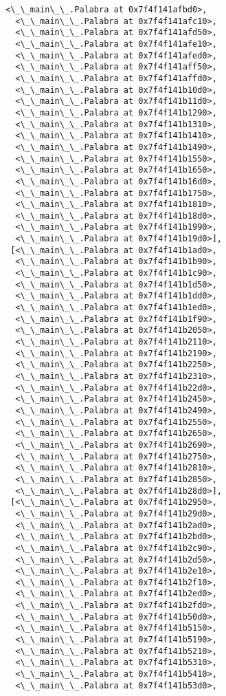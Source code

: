 \documentclass[12pt,a4paper,table]{article}
\begin{document}
\begin{tcolorbox}[breakable, size=fbox, boxrule=.5pt, pad at break*=1mm, opacityfill=0]
\begin{Verbatim}[commandchars=\\\{\}]
  <\_\_main\_\_.Palabra at 0x7f4f141afbd0>,
  <\_\_main\_\_.Palabra at 0x7f4f141afc10>,
  <\_\_main\_\_.Palabra at 0x7f4f141afd50>,
  <\_\_main\_\_.Palabra at 0x7f4f141afe10>,
  <\_\_main\_\_.Palabra at 0x7f4f141afed0>,
  <\_\_main\_\_.Palabra at 0x7f4f141aff50>,
  <\_\_main\_\_.Palabra at 0x7f4f141affd0>,
  <\_\_main\_\_.Palabra at 0x7f4f141b10d0>,
  <\_\_main\_\_.Palabra at 0x7f4f141b11d0>,
  <\_\_main\_\_.Palabra at 0x7f4f141b1290>,
  <\_\_main\_\_.Palabra at 0x7f4f141b1310>,
  <\_\_main\_\_.Palabra at 0x7f4f141b1410>,
  <\_\_main\_\_.Palabra at 0x7f4f141b1490>,
  <\_\_main\_\_.Palabra at 0x7f4f141b1550>,
  <\_\_main\_\_.Palabra at 0x7f4f141b1650>,
  <\_\_main\_\_.Palabra at 0x7f4f141b16d0>,
  <\_\_main\_\_.Palabra at 0x7f4f141b1750>,
  <\_\_main\_\_.Palabra at 0x7f4f141b1810>,
  <\_\_main\_\_.Palabra at 0x7f4f141b18d0>,
  <\_\_main\_\_.Palabra at 0x7f4f141b1990>,
  <\_\_main\_\_.Palabra at 0x7f4f141b19d0>],
 [<\_\_main\_\_.Palabra at 0x7f4f141b1ad0>,
  <\_\_main\_\_.Palabra at 0x7f4f141b1b90>,
  <\_\_main\_\_.Palabra at 0x7f4f141b1c90>,
  <\_\_main\_\_.Palabra at 0x7f4f141b1d50>,
  <\_\_main\_\_.Palabra at 0x7f4f141b1dd0>,
  <\_\_main\_\_.Palabra at 0x7f4f141b1ed0>,
  <\_\_main\_\_.Palabra at 0x7f4f141b1f90>,
  <\_\_main\_\_.Palabra at 0x7f4f141b2050>,
  <\_\_main\_\_.Palabra at 0x7f4f141b2110>,
  <\_\_main\_\_.Palabra at 0x7f4f141b2190>,
  <\_\_main\_\_.Palabra at 0x7f4f141b2250>,
  <\_\_main\_\_.Palabra at 0x7f4f141b2310>,
  <\_\_main\_\_.Palabra at 0x7f4f141b22d0>,
  <\_\_main\_\_.Palabra at 0x7f4f141b2450>,
  <\_\_main\_\_.Palabra at 0x7f4f141b2490>,
  <\_\_main\_\_.Palabra at 0x7f4f141b2550>,
  <\_\_main\_\_.Palabra at 0x7f4f141b2650>,
  <\_\_main\_\_.Palabra at 0x7f4f141b2690>,
  <\_\_main\_\_.Palabra at 0x7f4f141b2750>,
  <\_\_main\_\_.Palabra at 0x7f4f141b2810>,
  <\_\_main\_\_.Palabra at 0x7f4f141b2850>,
  <\_\_main\_\_.Palabra at 0x7f4f141b28d0>],
 [<\_\_main\_\_.Palabra at 0x7f4f141b2950>,
  <\_\_main\_\_.Palabra at 0x7f4f141b29d0>,
  <\_\_main\_\_.Palabra at 0x7f4f141b2ad0>,
  <\_\_main\_\_.Palabra at 0x7f4f141b2bd0>,
  <\_\_main\_\_.Palabra at 0x7f4f141b2c90>,
  <\_\_main\_\_.Palabra at 0x7f4f141b2d50>,
  <\_\_main\_\_.Palabra at 0x7f4f141b2e10>,
  <\_\_main\_\_.Palabra at 0x7f4f141b2f10>,
  <\_\_main\_\_.Palabra at 0x7f4f141b2ed0>,
  <\_\_main\_\_.Palabra at 0x7f4f141b2fd0>,
  <\_\_main\_\_.Palabra at 0x7f4f141b50d0>,
  <\_\_main\_\_.Palabra at 0x7f4f141b5150>,
  <\_\_main\_\_.Palabra at 0x7f4f141b5190>,
  <\_\_main\_\_.Palabra at 0x7f4f141b5210>,
  <\_\_main\_\_.Palabra at 0x7f4f141b5310>,
  <\_\_main\_\_.Palabra at 0x7f4f141b5410>,
  <\_\_main\_\_.Palabra at 0x7f4f141b53d0>,

\end{Verbatim}
\end{tcolorbox}
\end{document}
